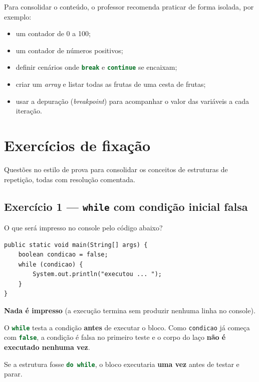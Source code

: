 \documentclass[12pt,a4paper]{article}
\newcommand{\codigo}[1]{\lstinline[language=Java,basicstyle=\ttfamily\small]|#1|}
\begin{document}
Para consolidar o conteúdo, o professor recomenda praticar de forma isolada, por
exemplo:
\begin{itemize}
  \item um contador de 0 a 100;
  \item um contador de números positivos;
  \item definir cenários onde \codigo{break} e \codigo{continue} se encaixam;
  \item criar um \emph{array} e listar todas as frutas de uma cesta de frutas;
  \item usar a depuração (\emph{breakpoint}) para acompanhar o valor das variáveis
        a cada iteração.
\end{itemize}

\section{Exercícios de fixação}

Questões no estilo de prova para consolidar os conceitos de estruturas de
repetição, todas com resolução comentada.

\subsection{Exercício 1 --- \texttt{while} com condição inicial falsa}

\begin{exercicio}
O que será impresso no console pelo código abaixo?

\begin{lstlisting}
public static void main(String[] args) {
    boolean condicao = false;
    while (condicao) {
        System.out.println("executou ... ");
    }
}
\end{lstlisting}
\end{exercicio}

\begin{resolucao}
\textbf{Nada é impresso} (a execução termina sem produzir nenhuma linha no
console).

O \codigo{while} testa a condição \textbf{antes} de executar o bloco. Como
\codigo{condicao} já começa com \codigo{false}, a condição é falsa no primeiro
teste e o corpo do laço \textbf{não é executado nenhuma vez}.

Se a estrutura fosse \codigo{do while}, o bloco executaria \textbf{uma vez} antes
de testar e parar.
\end{resolucao}
\end{document}
